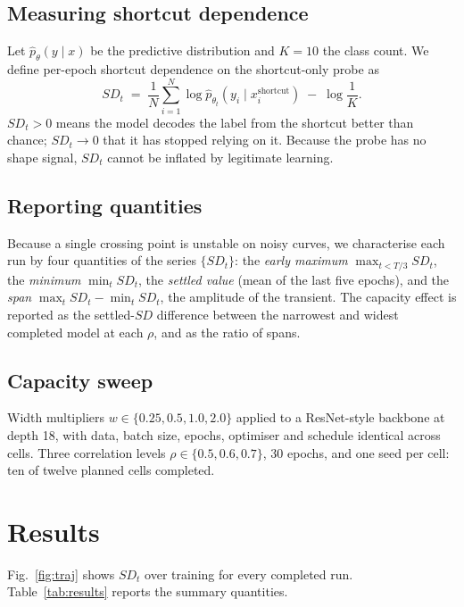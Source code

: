 \documentclass[conference]{IEEEtran}
\begin{document}
\subsection{Measuring shortcut dependence}

Let $\hat p_\theta(y\mid x)$ be the predictive distribution and $K=10$ the class count. We
define per-epoch shortcut dependence on the shortcut-only probe as
\begin{equation}
SD_t \;=\; \frac{1}{N}\sum_{i=1}^{N}\log \hat p_{\theta_t}\!\left(y_i \mid
x^{\text{shortcut}}_i\right) \;-\; \log\frac{1}{K}.
\label{eq:sd}
\end{equation}
$SD_t>0$ means the model decodes the label from the shortcut better than chance; $SD_t\to0$
that it has stopped relying on it. Because the probe has no shape signal, $SD_t$ cannot be
inflated by legitimate learning.

\subsection{Reporting quantities}

Because a single crossing point is unstable on noisy curves, we characterise each run by
four quantities of the series $\{SD_t\}$: the \emph{early maximum}
$\max_{t<T/3}SD_t$, the \emph{minimum} $\min_t SD_t$, the \emph{settled value} (mean of the
last five epochs), and the \emph{span} $\max_t SD_t-\min_t SD_t$, the amplitude of the
transient. The capacity effect is reported as the settled-$SD$ difference between the
narrowest and widest completed model at each $\rho$, and as the ratio of spans.

\subsection{Capacity sweep}

Width multipliers $w\in\{0.25,0.5,1.0,2.0\}$ applied to a ResNet-style backbone at depth
18, with data, batch size, epochs, optimiser and schedule identical across cells. Three
correlation levels $\rho\in\{0.5,0.6,0.7\}$, 30 epochs, and one seed per cell: ten of
twelve planned cells completed.

\section{Results}

Fig.~\ref{fig:traj} shows $SD_t$ over training for every completed run.
Table~\ref{tab:results} reports the summary quantities.
\end{document}
